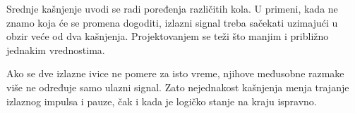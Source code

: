Srednje kašnjenje uvodi se radi poređenja različitih kola. U primeni, kada ne znamo koja će se promena dogoditi, izlazni signal treba sačekati uzimajući u obzir veće od dva kašnjenja. Projektovanjem se teži što manjim i približno jednakim vrednostima.

Ako se dve izlazne ivice ne pomere za isto vreme, njihove međusobne razmake više ne određuje samo ulazni signal. Zato nejednakost kašnjenja menja trajanje izlaznog impulsa i pauze, čak i kada je logičko stanje na kraju ispravno.
